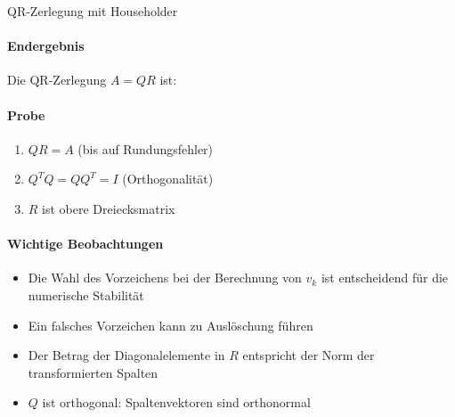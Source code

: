 \begin{example2}[breakable]{QR-Zerlegung mit Householder}
\paragraph{Endergebnis}
Die QR-Zerlegung $A = QR$ ist:
\vspace{2mm}\\

\paragraph{Probe}
\begin{enumerate}
    \item $QR = A$ (bis auf Rundungsfehler)
    \item $Q^TQ = QQ^T = I$ (Orthogonalität)
    \item $R$ ist obere Dreiecksmatrix
\end{enumerate}

\paragraph{Wichtige Beobachtungen}
\begin{itemize}
    \item Die Wahl des Vorzeichens bei der Berechnung von $v_k$ ist entscheidend für die numerische Stabilität
    \item Ein falsches Vorzeichen kann zu Auslöschung führen
    \item Der Betrag der Diagonalelemente in $R$ entspricht der Norm der transformierten Spalten
    \item $Q$ ist orthogonal: Spaltenvektoren sind orthonormal
\end{itemize}
\end{example2}

